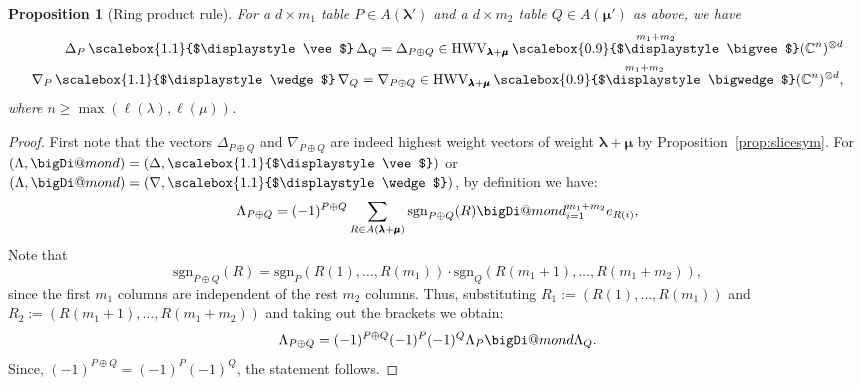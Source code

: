 \documentclass[12pt, reqno]{amsart}
\makeatletter
\newtheorem{proposition}[theorem]{Proposition}
\theoremstyle{definition}
\newcommand{\sgn}{\mathrm{sgn}}
\newcommand{\msgn}{\mathrm{msgn}}
\let\oldbigwedge\bigwedge
\let\oldbigvee\bigvee
\let\oldwedge\wedge
\let\oldvee\vee
\renewcommand{\bigwedge}{
  \mathop{
    \vcenter{
      \hbox{\scalebox{0.9}{$\displaystyle\oldbigwedge$}}
    }
  }
}
\renewcommand{\bigvee}{
  \mathop{
    \vcenter{
      \hbox{\scalebox{0.9}{$\displaystyle\oldbigvee$}}
    }
  }
}
\renewcommand{\wedge}{
  \mathop{
    \vcenter{
      \hbox{\scalebox{1.1}{$\displaystyle\oldwedge$}}
    }
  }
}
\renewcommand{\vee}{
  \mathop{
    \vcenter{
      \hbox{\scalebox{1.1}{$\displaystyle\oldvee$}}
    }
  }
}
\newcommand\bigDiamond{\mathop{\mathpalette\bigDi@mond\relax}}
\newcommand\bigDi@mond[2]{%
  \vcenter{\hbox{\m@th
    \scalebox{\ifx#1\displaystyle 2\else1.2\fi}{$#1\Diamond$}%
  }}%
}
\makeatother
\begin{document}
\begin{proposition}[Ring product rule]\label{prop:ring}
    For a $d \times m_1$ table $P \in A(\pmb{\lambda'})$ and a $d \times m_2$ table $Q \in A(\pmb{\mu'})$ as above, we have 
    \begin{align*}
        \Delta_{P} \vee \Delta_Q 
            = \Delta_{P \oplus Q} 
            \in \mathrm{HWV}_{\pmb{\lambda} + \pmb{\mu}} \bigvee^{m_1 + m_2} (\mathbb{C}^n)^{\otimes d}
        \\%
        \nabla_P \wedge \nabla_Q 
            = \nabla_{P \oplus Q} 
            \in \mathrm{HWV}_{\pmb{\lambda} + \pmb{\mu}} \bigwedge^{m_1 + m_2} (\mathbb{C}^n)^{\otimes d},
    \end{align*}
    where $n \ge \max(\ell(\lambda), \ell(\mu))$.%
\end{proposition}
\begin{proof}
    First note that the vectors $\Delta_{P \oplus Q}$ and $\nabla_{P \oplus Q}$ are indeed highest weight vectors of weight $\pmb{\lambda} + \pmb{\mu}$ by Proposition~\ref{prop:slicesym}.
    For $(\Lambda,{\textstyle\bigDiamond}) = (\Delta, \vee)$ or $(\Lambda,{\textstyle\bigDiamond}) = (\nabla, \wedge)$, by definition we have:
    $$
        \Lambda_{P \oplus Q} = (-1)^{P\oplus Q}\sum_{R \in A(\pmb{\lambda}+\pmb{\mu})} \sgn_{P \oplus Q}(R) {\textstyle\bigDiamond}_{i=1}^{m_1 + m_2} e_{R(i)},
    $$
    Note that $$\sgn_{P\oplus Q}(R) = \sgn_P(R(1),\ldots,R(m_1)) \cdot \sgn_Q(R(m_1 + 1),\ldots,R(m_1 + m_2)),$$ 
    since the first $m_1$ columns are independent of the rest $m_2$ columns.
    Thus, substituting $R_1 := (R(1),\ldots,R(m_1))$ and $R_2 := (R(m_1+1),\ldots,R(m_1+m_2))$ and taking out the brackets we obtain:
    $$
    \Lambda_{P \oplus Q} = (-1)^{P\oplus Q} (-1)^P (-1)^Q \Lambda_P {\textstyle\bigDiamond} \Lambda_Q.
    $$
    Since, $(-1)^{P\oplus Q} = (-1)^P (-1)^Q$, the statement follows.
\end{proof}
\end{document}
